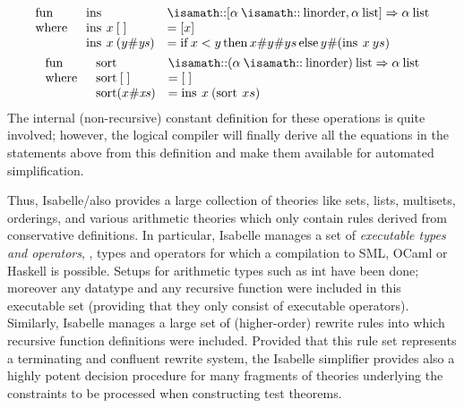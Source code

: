 \begin{gather}\label{eq:sortdef}
  \begin{array}{lll}
    \fun
    &\enspace\operatorname{ins} & \ofType
    [\alpha\ofType\mathrm{linorder}, \HolList{\alpha}]
    \Rightarrow
    \HolList{\alpha}\\
    \where
    &\enspace \operatorname{ins}\ap x \ap  [\;] &= [x]\\
    &\enspace \operatorname{ins}\ap x \ap (y\#\mathit{ys})&=
    \HolIf x < y
    \HolThen x\#  y \# ys
    \HolElse y\#(\operatorname{ins} \ap x \ap ys)
 \end{array}\\
  \begin{array}{lll}
    \fun
    &\enspace\operatorname{sort} & \ofType
    \HolList{(\alpha\ofType\mathrm{linorder})}
    \Rightarrow
    \HolList{\alpha}\\
    \where
    &\enspace \operatorname{sort}\ap [\;] &= [\;]\\
    &\enspace \operatorname{sort} (x\#\mathit{xs})&=
    \operatorname{ins}\ap x\ap (\operatorname{sort}\ap xs)
   \end{array}
\end{gather}
The internal (non-recursive) constant definition for these operations
is quite involved; however, the logical compiler will finally derive
all the equations in the statements above from this definition and
make them available for automated simplification.

Thus, Isabelle/\HOL also provides a large collection of theories like
sets, lists, multisets, orderings, and various arithmetic theories
which only contain rules derived from conservative definitions. In
particular, Isabelle manages a set of \emph{executable types and
  operators}, \ie, types and operators for which a compilation to
SML, OCaml or Haskell is possible. Setups for arithmetic types
such as $\text{int}$ have been done; moreover any datatype and any
recursive function were included in this executable set (providing
that they only consist of executable operators). Similarly, Isabelle
manages a large set of (higher-order) rewrite rules into which
recursive function definitions were included. Provided that this
rule set represents a terminating and confluent rewrite system, the
Isabelle simplifier provides also a highly potent decision procedure
for many fragments of theories underlying the constraints to be
processed when constructing test theorems.

